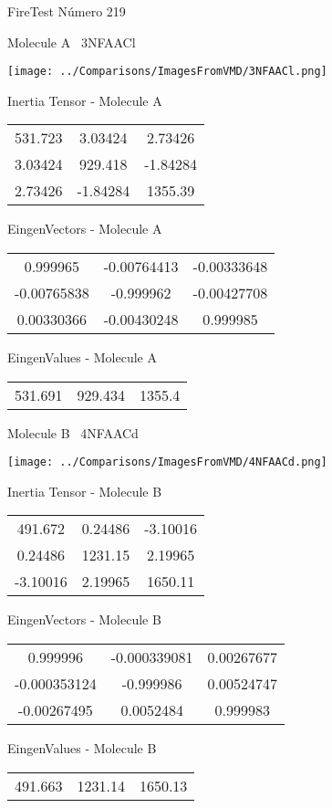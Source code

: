 \vtab[-3cm]
\begin{center}
{\large FireTest \tab Número 219}
\end{center}
\begin{multicols}{2}
\begin{center}

Molecule A \
3NFAACl

\texttt{[image: ../Comparisons/ImagesFromVMD/3NFAACl.png]}

Inertia Tensor - Molecule A \\
\begin{tabular}{|c c c|}
531.723	 & 	3.03424	 & 	2.73426	 \\
3.03424	 & 	929.418	 & 	-1.84284	 \\
2.73426	 & 	-1.84284	 & 	1355.39
\end{tabular}

\vtab
 EingenVectors - Molecule A     \\
\begin{tabular}{|c c c|}
0.999965	 & 	-0.00764413	 & 	-0.00333648	 \\
-0.00765838	 & 	-0.999962	 & 	-0.00427708	 \\
0.00330366	 & 	-0.00430248	 & 	0.999985
\end{tabular}

\vtab
 EingenValues - Molecule A     \\
\begin{tabular}{|c c c|}
531.691	 & 	929.434	 & 	1355.4	 \\
\end{tabular}
\columnbreak

Molecule B \
4NFAACd

\texttt{[image: ../Comparisons/ImagesFromVMD/4NFAACd.png]}

Inertia Tensor - Molecule B \\
\begin{tabular}{|c c c|}
491.672	 & 	0.24486	 & 	-3.10016	 \\
0.24486	 & 	1231.15	 & 	2.19965	 \\
-3.10016	 & 	2.19965	 & 	1650.11
\end{tabular}

\vtab
 EingenVectors - Molecule B     \\
\begin{tabular}{|c c c|}
0.999996	 & 	-0.000339081	 & 	0.00267677	 \\
-0.000353124	 & 	-0.999986	 & 	0.00524747	 \\
-0.00267495	 & 	0.0052484	 & 	0.999983
\end{tabular}

\vtab
 EingenValues - Molecule B     \\
\begin{tabular}{|c c c|}
491.663	 & 	1231.14	 & 	1650.13	 \\
\end{tabular}

\end{center}
\end{multicols}

